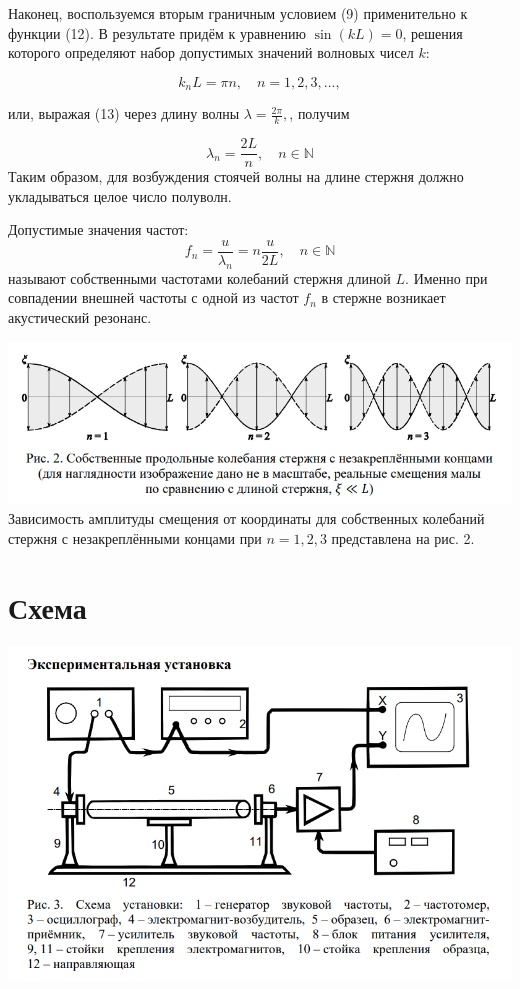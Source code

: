 \documentclass[a4paper, 12pt]{article}
\begin{document}
        Наконец, воспользуемся вторым граничным условием (9) применительно к функции (12). В результате придём к уравнению $\sin(kL) = 0$, решения которого определяют набор допустимых значений волновых чисел $k$:

        \begin{equation}
            k_n L = \pi n, \quad n = 1, 2, 3,...,
        \end{equation}
        
        или, выражая (13) через длину волны $\lambda = \frac{2 \pi}{k},$, получим

        \begin{equation}
            \lambda_n = \frac{2L}{n}, \quad n \in \mathbb{N}
        \end{equation}
        Таким образом, для возбуждения стоячей волны на длине стержня должно укладываться целое число полуволн.
        
        Допустимые значения частот:
        \begin{equation}
            f_n = \frac{u}{\lambda_n} = n \frac{u}{2L}, \quad n \in \mathbb{N}
        \end{equation}
        называют собственными частотами колебаний стержня длиной $L$. Именно при совпадении внешней частоты с одной из частот $f_n$ в стержне возникает акустический резонанс.
        
        \includegraphics[scale=0.75]{picture2.png}
        Зависимость амплитуды смещения от координаты для собственных колебаний стержня с незакреплёнными концами при $n = 1,2,3$ представлена на рис. 2. 

    \section{Схема}

    \includegraphics[scale=0.75]{picture3.png}
    
\end{document}
